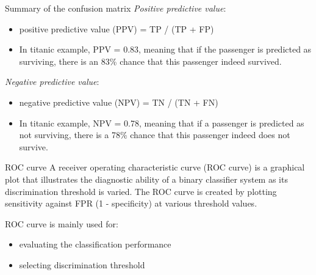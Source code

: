 \documentclass[10pt]{beamer}\usepackage[]{graphicx}\usepackage[]{xcolor}
\begin{document}

\begin{frame}[fragile]{Summary of the confusion matrix}
\emph{Positive predictive value}:
\begin{itemize}
\item positive predictive value (PPV) = TP / (TP + FP)
\item In titanic example, PPV = 0.83, meaning that if the passenger is predicted as surviving, there is an 83\% chance that this passenger indeed survived. 
\end{itemize}
\va
\emph{Negative predictive value}:
\begin{itemize}
\item negative predictive value (NPV) = TN / (TN + FN)
\item In titanic example, NPV = 0.78, meaning that if a passenger is predicted as not surviving, there is a 78\% chance that this passenger indeed does not survive.  
\end{itemize}
\end{frame}


\begin{frame}[fragile]{ROC curve}
A receiver operating characteristic curve (ROC curve) is a graphical plot that illustrates the diagnostic ability of a binary classifier system as its discrimination threshold is varied. The ROC curve is created by plotting sensitivity against FPR (1 - specificity) at various threshold values. 
\va

ROC curve is mainly used for:
\begin{itemize}
\item evaluating the classification performance
\item selecting discrimination threshold
\end{itemize}

\end{frame}

\end{document}
